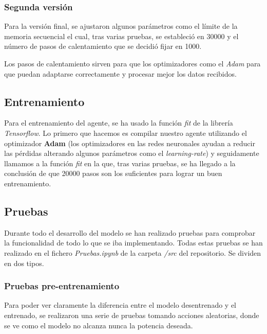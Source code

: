 \subsubsection{Segunda versión}

Para la versión final, se ajustaron algunos parámetros como el límite de la memoria secuencial el cual, tras varias pruebas, se estableció en 30000 y el número de pasos de calentamiento que se decidió fijar en 1000.

Los pasos de calentamiento sirven para que los optimizadores como el \textit{Adam} para que puedan adaptarse correctamente y procesar mejor los datos recibidos.

\subsection{Entrenamiento}

Para el entrenamiento del agente, se ha usado la función \textit{fit} de la librería \textit{Tensorflow}. 
Lo primero que hacemos es compilar nuestro agente utilizando el optimizador \textbf{Adam} (los optimizadores en las redes neuronales ayudan a reducir las pérdidas alterando algunos parámetros como el \textit{learning-rate}) y seguidamente llamamos a la función \textit{fit} en la que, tras varias pruebas, se ha llegado a la conclusión de que 20000 pasos son los suficientes para lograr un buen entrenamiento.


\subsection{Pruebas}

Durante todo el desarrollo del modelo se han realizado pruebas para comprobar la funcionalidad de todo lo que se iba implementando. Todas estas pruebas se han realizado en el fichero \textit{Pruebas.ipynb} de la carpeta \textit{/src} del repositorio. Se dividen en dos tipos.

\subsubsection{Pruebas pre-entrenamiento}

Para poder ver claramente la diferencia entre el modelo desentrenado y el entrenado, se realizaron una serie de pruebas tomando acciones aleatorias, donde se ve como el modelo no alcanza nunca la potencia deseada.

\label{fig:pre}

